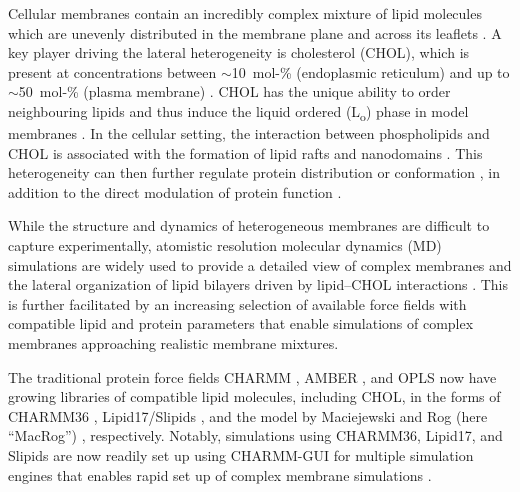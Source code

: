 \documentclass[journal=jctcce]{achemso}
\begin{document}
Cellular membranes contain an incredibly complex mixture of lipid molecules \cite{lorent2020plasma} which are unevenly distributed in the membrane plane and across its leaflets \cite{van2008membrane,wang2020membrane,kinnun2020lateral}. A key player driving the lateral heterogeneity is cholesterol (CHOL), which is present at concentrations between $\sim$10~mol-\% (endoplasmic reticulum) and up to $\sim$50~mol-\% (plasma membrane) \cite{van2008membrane}. CHOL has the unique ability to order neighbouring lipids and thus induce the liquid ordered (L\textsubscript{o}) phase in model membranes \cite{mouritsen2004s,ipsen87,kinnunen91,rog2009ordering}. In the cellular setting, the interaction between phospholipids and CHOL is associated with the formation of lipid rafts and nanodomains \cite{Simons97,cebecauer2018membrane}. This heterogeneity can then further regulate protein distribution \cite{milovanovic2015hydrophobic} or conformation \cite{kelkar2007modulation}, %
in addition to the direct modulation of protein function \cite{gimpl2016interaction,guixa2017membrane}.

While the structure and dynamics of heterogeneous membranes are difficult to capture experimentally, atomistic resolution molecular dynamics (MD) simulations are widely used to provide a detailed view of complex membranes and the lateral organization of lipid bilayers driven by lipid--CHOL interactions \cite{rog14,rog2009ordering,berkowitz2009detailed,enkavi2019multiscale,marrink2019computational}. This is further facilitated by an increasing selection of available force fields with compatible lipid and protein parameters that enable simulations of complex membranes approaching realistic membrane mixtures. 

The traditional protein force fields CHARMM \cite{brooks1983charmm}, AMBER \cite{cornell1995second}, and OPLS \cite{jorgensen1988opls,harder2016opls3} now have growing libraries of compatible lipid molecules, including CHOL, in the forms of CHARMM36 \cite{Klauda06,lim12}, Lipid17/Slipids \cite{dickson14,madej15,jambeck12,jambeck12b,jambeck13b,grote2020optimization}, and the model by Maciejewski and Rog (here ``MacRog'') \cite{maciejewski14,kulig14,kulig15,Kulig15b}, respectively. Notably, simulations using CHARMM36, Lipid17, and Slipids are now readily set up using CHARMM-GUI for multiple simulation engines that enables rapid set up of complex membrane simulations \cite{lee16,lee2020charmm}. 
\end{document}
